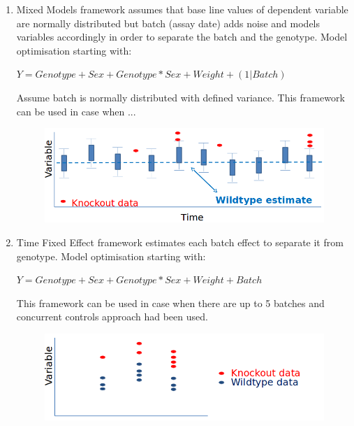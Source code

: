 \documentclass[12pt,a4paper]{article}
\begin{document}
\begin{enumerate}
\item Mixed Models framework assumes that base line values of dependent variable are normally distributed but batch (assay date) adds noise and models variables accordingly in order to separate the batch and the genotype. 
Model optimisation starting with:

$Y=Genotype+Sex+Genotype*Sex + Weight + (1|Batch)$

Assume batch is normally distributed with defined variance. This framework can be used in case when ...
\begin{figure}[!htpb]%
\centerline{\includegraphics[scale=0.4]{MM_simple.png}}
\end{figure}

\item Time Fixed Effect framework estimates each batch effect to separate it from genotype.
Model optimisation starting with:

$Y=Genotype+Sex+Genotype*Sex + Weight + Batch$

This framework can be used in case when there are up to 5 batches and concurrent controls approach had been used. 
\begin{figure}[!htpb]%
\centerline{\includegraphics[scale=0.4]{TFE_simple.png}}
\end{figure}


\end{enumerate}
\end{document}
